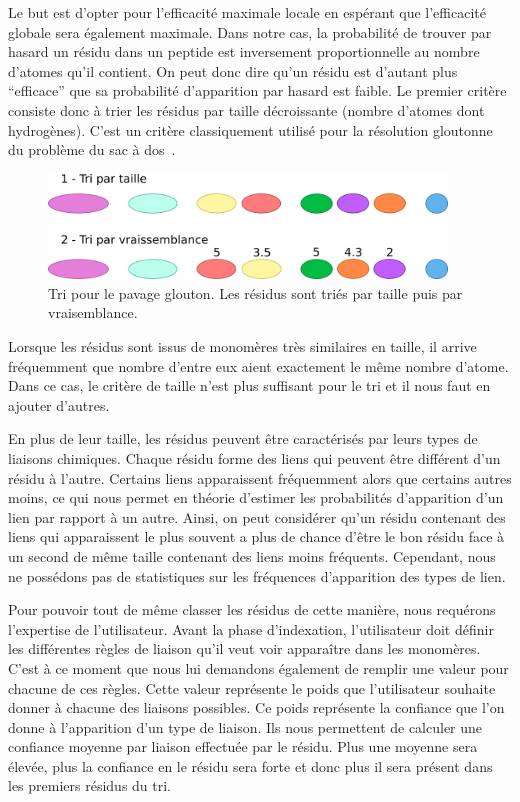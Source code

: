 Le but est d'opter pour l'efficacité maximale locale en espérant que l'efficacité globale sera également maximale.
Dans notre cas, la probabilité de trouver par hasard un résidu dans un peptide est inversement proportionnelle au nombre d'atomes qu'il contient.
On peut donc dire qu'un résidu est d'autant plus ``efficace'' que sa probabilité d'apparition par hasard est faible.
Le premier critère consiste donc à trier les résidus par taille décroissante (nombre d'atomes dont hydrogènes).
C'est un critère classiquement utilisé pour la résolution gloutonne du problème du sac à dos~\cite{_probleme_2016}.

\begin{figure}
  \begin{center}
    \includegraphics[width=400px]{Figures/s2m/pavage/tri.png}
    \caption{\label{tri_glouton}Tri pour le pavage glouton.
    Les résidus sont triés par taille puis par vraisemblance.}
  \end{center}
\end{figure}

Lorsque les résidus sont issus de monomères très similaires en taille, il arrive fréquemment que nombre d'entre eux
aient exactement le même nombre d'atome.
Dans ce cas, le critère de taille n'est plus suffisant pour le tri et il nous faut en ajouter d'autres.

En plus de leur taille, les résidus peuvent être caractérisés par leurs types de liaisons chimiques.
Chaque résidu forme des liens qui peuvent être différent d'un résidu à l'autre.
Certains liens apparaissent fréquemment alors que certains autres moins, ce qui nous permet en théorie d'estimer les
probabilités d'apparition d'un lien par rapport à un autre.
Ainsi, on peut considérer qu'un résidu contenant des liens qui apparaissent le plus souvent a plus de chance d'être le bon résidu
face à un second de même taille contenant des liens moins fréquents.
Cependant, nous ne possédons pas de statistiques sur les fréquences d'apparition des types de lien.

Pour pouvoir tout de même classer les résidus de cette manière, nous requérons l'expertise de l'utilisateur.
Avant la phase d'indexation, l'utilisateur doit définir les différentes règles de liaison qu'il veut voir apparaître dans les monomères.
C'est à ce moment que nous lui demandons également de remplir une valeur pour chacune de ces règles.
Cette valeur représente le poids que l'utilisateur souhaite donner à chacune des liaisons possibles.
Ce poids représente la confiance que l'on donne à l'apparition d'un type de liaison.
Ils nous permettent de calculer une confiance moyenne par liaison effectuée par le résidu.
Plus une moyenne sera élevée, plus la confiance en le résidu sera forte et donc plus il sera présent dans les premiers résidus du tri.

